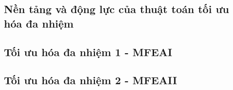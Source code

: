 \subsection{Nền tảng và động lực của thuật toán tối ưu hóa đa nhiệm}

\newpage
\subsection{Tối ưu hóa đa nhiệm 1 - MFEAI}

\newpage
\subsection{Tối ưu hóa đa nhiệm 2 - MFEAII}
